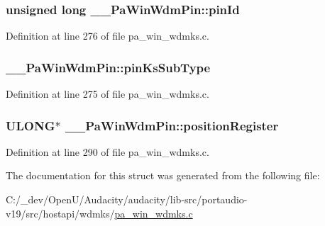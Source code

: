 \subsubsection[{\texorpdfstring{pin\+Id}{pinId}}]{\setlength{\rightskip}{0pt plus 5cm}unsigned long \+\_\+\+\_\+\+Pa\+Win\+Wdm\+Pin\+::pin\+Id}\hypertarget{struct_____pa_win_wdm_pin_a81ab014de4b698e66915fb28e01cb7c7}{}\label{struct_____pa_win_wdm_pin_a81ab014de4b698e66915fb28e01cb7c7}


Definition at line 276 of file pa\+\_\+win\+\_\+wdmks.\+c.

\subsubsection[{\texorpdfstring{pin\+Ks\+Sub\+Type}{pinKsSubType}}]{ \+\_\+\+\_\+\+Pa\+Win\+Wdm\+Pin\+::pin\+Ks\+Sub\+Type}\hypertarget{struct_____pa_win_wdm_pin_a8f64c1157494c02e8be9d85d72f359fe}{}\label{struct_____pa_win_wdm_pin_a8f64c1157494c02e8be9d85d72f359fe}


Definition at line 275 of file pa\+\_\+win\+\_\+wdmks.\+c.

\subsubsection[{\texorpdfstring{position\+Register}{positionRegister}}]{\setlength{\rightskip}{0pt plus 5cm}U\+L\+O\+NG$\ast$ \+\_\+\+\_\+\+Pa\+Win\+Wdm\+Pin\+::position\+Register}\hypertarget{struct_____pa_win_wdm_pin_a24343f8f122ae703ef0864843868ef6f}{}\label{struct_____pa_win_wdm_pin_a24343f8f122ae703ef0864843868ef6f}


Definition at line 290 of file pa\+\_\+win\+\_\+wdmks.\+c.



The documentation for this struct was generated from the following file\+:\begin{DoxyCompactItemize}
\item 
C\+:/\+\_\+dev/\+Open\+U/\+Audacity/audacity/lib-\/src/portaudio-\/v19/src/hostapi/wdmks/\hyperlink{pa__win__wdmks_8c}{pa\+\_\+win\+\_\+wdmks.\+c}\end{DoxyCompactItemize}
